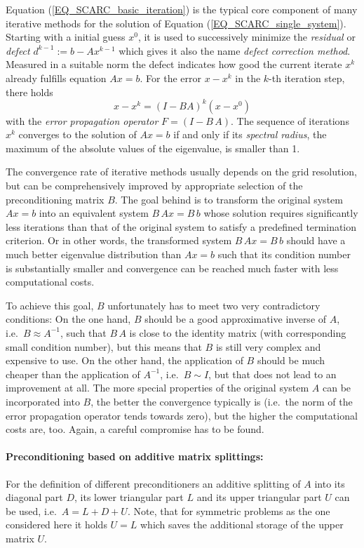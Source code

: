 Equation (\ref{EQ_SCARC_basic_iteration}) is the typical core component of many iterative methods for the solution of Equation (\ref{EQ_SCARC_single_system}).
Starting with a initial guess $x^0$, it is used to successively minimize the {\it residual} or {\it defect}  $d^{k-1}:=b-A x^{k-1}$ which gives it also the name {\it defect correction method}.
Measured in a suitable norm the defect indicates how good the current iterate $x^k$ already fulfills equation $Ax=b$.
For the error $x-x^k$ in the $k$-th iteration step, there holds 
 \[ x-x^k = (I- B A)^k (x-x^0)\]
with the {\it error propagation operator} $F=(I- B \,A)$. The sequence of iterations $x^k$ converges to the solution of $Ax=b$ if and only if its {\it spectral radius}, the maximum of the absolute values of the eigenvalue, is smaller than 1. 

The convergence rate of iterative methods usually depends on the grid resolution, but can be comprehensively improved by appropriate selection of the preconditioning matrix $B$.
The goal behind is to transform the original system $Ax=b$  into an equivalent system $B\,Ax=B\,b$ whose solution requires significantly less iterations than that of the original system to satisfy a predefined termination criterion.
Or in other words, the transformed system $B\,Ax=B\,b$ should have a much better eigenvalue distribution than $Ax=b$ such that its condition number is substantially smaller and convergence can be reached much faster with less computational costs.

To achieve this goal, $B$ unfortunately has to meet two very contradictory conditions:
On the one hand, $B $ should be a good approximative inverse of $A$, i.e.\ $B \approx A^{-1}$, such that $B\,A$ is close to the identity matrix (with corresponding small condition number), but this means that $B$ is still very complex and expensive to use.
On the other hand, the application of $B$ should be much cheaper than the application of $A^{-1}$, i.e.\ $B \sim I$,  but that does not lead to an improvement at all. The more special properties of the original system $A$ can be incorporated into $B$, the better the convergence typically  is (i.e.\ the norm of the error propagation operator tends towards zero), but the higher the computational costs are, too. 
Again, a careful compromise has to be found.

\newpage
\paragraph{Preconditioning based on additive matrix splittings:}
For the definition of different preconditioners an additive 
splitting of $A$ into its diagonal part $D$, its lower triangular part $L$ and its upper triangular part $U$ can be used, i.e.\ $A=L + D+U$. Note, that for symmetric problems as the one considered here it holds $U=L$ which saves the additional storage of the upper matrix $U$.

